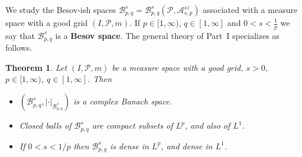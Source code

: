 \documentclass[11pt]{amsart}
\newtheorem{theorem}{Theorem}[section]
\theoremstyle{definition}
\begin{document}
We study the Besov-ish spaces
$\mathcal{B}^s_{p,q}=\mathcal{B}^s_{p,q}(\mathcal{P},\mathcal{A}^{sz}_{s,p})$
associated with a measure space with a good grid $(I,\mathcal{P},m)$. If
$p\in [1,\infty)$, $q\in [1,\infty]$ and $0<s<\frac{1}{p}$ we say that
$\mathcal{B}^s_{p,q}$ is a {\bf Besov space}. The general theory of Part~I
specializes as follows.

\begin{theorem}\label{souzamain}
Let $(I,\mathcal{P},m)$ be a measure space with a good grid, $s>0$,
$p \in [1,\infty)$, $q \in [1,\infty]$. Then
\begin{itemize}
\item[A.] $(\mathcal{B}^s_{p,q}, |\cdot|_{\mathcal{B}^s_{p,q}})$ is a complex
Banach space.
\item[B.] Closed balls of $\mathcal{B}^s_{p,q}$ are compact subsets of $L^p$,
and also of $L^1$.
\item[C.] If $0<s<1/p$ then $\mathcal{B}^s_{p,q}$ is dense in $L^p$, and
dense in $L^1$.
\end{itemize}
\end{theorem}
\end{document}
